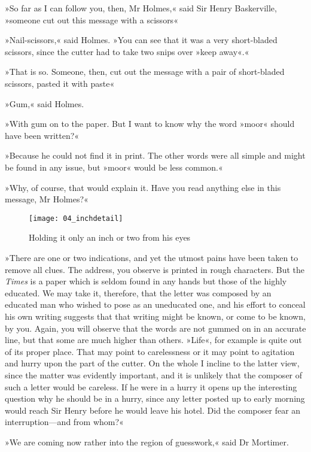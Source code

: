 »So far as I can follow you, then, Mr Holmes,« said Sir Henry Baskerville, »someone cut out this message with a scissors\longdash«

»Nail-scissors,« said Holmes. »You can see that it was a very short-bladed scissors, since the cutter had to take two snips over »keep away«.«

»That is so. Someone, then, cut out the message with a pair of short-bladed scissors, pasted it with paste\longdash«

»Gum,« said Holmes.

»With gum on to the paper. But I want to know why the word »moor« should have been written?«

»Because he could not find it in print. The other words were all simple and might be found in any issue, but »moor« would be less common.«

»Why, of course, that would explain it. Have you read anything else in this message, Mr Holmes?«

\begin{figure}[tbhp]
\centering
\texttt{[image: 04\_inchdetail]}
\caption{Holding it only an inch or two from his eyes}
\end{figure}

»There are one or two indications, and yet the utmost pains have been taken to remove all clues. The address, you observe is printed in rough characters. But the \textit{Times} is a paper which is seldom found in any hands but those of the highly educated. We may take it, therefore, that the letter was composed by an educated man who wished to pose as an uneducated one, and his effort to conceal his own writing suggests that that writing might be known, or come to be known, by you. Again, you will observe that the words are not gummed on in an accurate line, but that some are much higher than others. »Life«, for example is quite out of its proper place. That may point to carelessness or it may point to agitation and hurry upon the part of the cutter. On the whole I incline to the latter view, since the matter was evidently important, and it is unlikely that the composer of such a letter would be careless. If he were in a hurry it opens up the interesting question why he should be in a hurry, since any letter posted up to early morning would reach Sir Henry before he would leave his hotel. Did the composer fear an interruption—and from whom?«

»We are coming now rather into the region of guesswork,« said Dr Mortimer.

